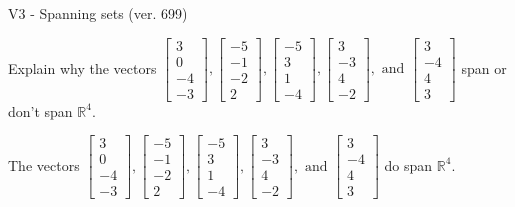 \begin{exercise}
  \begin{exerciseTitle}V3 - Spanning sets (ver. 699)\end{exerciseTitle}
  \begin{exerciseStatement}
    Explain why the vectors \(\left[\begin{array}{r}
3 \\
0 \\
-4 \\
-3
\end{array}\right] , \left[\begin{array}{r}
-5 \\
-1 \\
-2 \\
2
\end{array}\right] , \left[\begin{array}{r}
-5 \\
3 \\
1 \\
-4
\end{array}\right] , \left[\begin{array}{r}
3 \\
-3 \\
4 \\
-2
\end{array}\right] , \text{ and } \left[\begin{array}{r}
3 \\
-4 \\
4 \\
3
\end{array}\right]\) span or don't span \(\mathbb{R}^4\). 
	


  \end{exerciseStatement}
  \begin{exerciseAnswer}
   The vectors \(\left[\begin{array}{r}
3 \\
0 \\
-4 \\
-3
\end{array}\right] , \left[\begin{array}{r}
-5 \\
-1 \\
-2 \\
2
\end{array}\right] , \left[\begin{array}{r}
-5 \\
3 \\
1 \\
-4
\end{array}\right] , \left[\begin{array}{r}
3 \\
-3 \\
4 \\
-2
\end{array}\right] , \text{ and } \left[\begin{array}{r}
3 \\
-4 \\
4 \\
3
\end{array}\right]\) 
  	 do  
	span \(\mathbb{R}^4\).
  



\end{exerciseAnswer}
\end{exercise}
